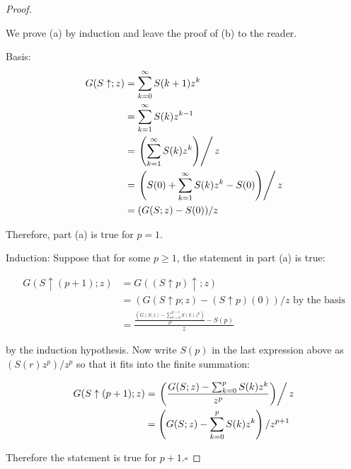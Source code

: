 \documentclass[10pt,]{book}
\theoremstyle{plain}
\theoremstyle{definition}
\theoremstyle{definition}
\theoremstyle{definition}
\theoremstyle{definition}
\numberwithin{equation}{section}
\begin{document}
\begin{proof}\hypertarget{proof-2}{}
We prove (a)  by induction and leave the proof of (b) to the reader.  %
\par
Basis: 
\begin{equation*}
\begin{split}
  G(S\uparrow;z) &= \sum_{k=0}^{\infty} S(k+1) z^k\\
  		& =\sum_{k=1}^{\infty} S(k) z^{k-1}\\
  		& =\left.\left(\sum_{k=1}^{\infty} S(k) z^k\right)\right/z\\ 		
  		& =\left.\left(S(0)+\sum_{k=1}^{\infty} S(k) z^k-S(0)\right)\right/z\\
  		& =(G(S;z)-S(0))/z
\end{split}
\end{equation*}

Therefore, part (a) is true for \(p=1\).%
\par
Induction: Suppose that for some \(p\geq 1\), the statement in part (a) is true:

\begin{equation*}
\begin{split}
 G(S\uparrow (p+1);z) &= G((S\uparrow p)\uparrow ;z)\\
		& = (G(S\uparrow p ;z)-(S\uparrow p)(0))/z \textrm{ by the basis}\\
		& = \frac{\frac{\left(G(S;z)-\sum_{k=0}^{p-1} S(k) z^k\right)}{z^p}-S(p)}{z}
\end{split}
\end{equation*}

by the induction hypothesis. Now write \(S(p)\) in the last expression above as \(\left(S(r)z^p \right)/z^p\) so that it fits into the finite summation:

\begin{equation*}
\begin{split}
 G(S\uparrow (p+1);z) & =\left.\left(\frac{G(S;z)-\sum_{k=0}^p S(k) z^k}{z^p}\right)\right/z\\
					& = \left(G(S;z)-\sum_{k=0}^p S(k) z^k\right)/z^{p+1}
\end{split}
\end{equation*}
%
\par
Therefore the statement is true for \(p+1\).\(\square\)%
\end{proof}
\typeout{************************************************}
\typeout{************************************************}
\end{document}
